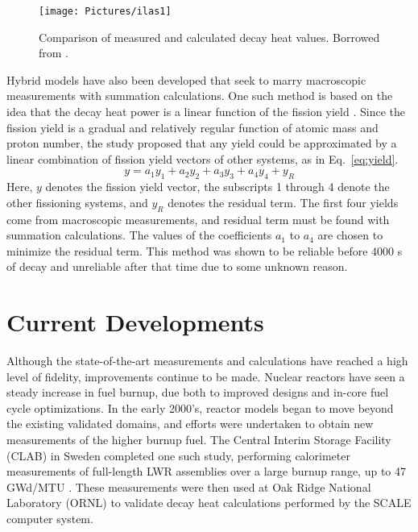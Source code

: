 \documentclass{anstrans}
\begin{document}
\begin{figure}[ht]
 \centering
 \texttt{[image: Pictures/ilas1]}
 \caption{Comparison of measured and calculated decay heat values. Borrowed from \cite{Ilas2006}.}
 \label{fig:ilas1}
\end{figure}

Hybrid models have also been developed that seek to marry macroscopic measurements with summation calculations. One such method is based on the idea that the decay heat power is a linear function of the fission yield \cite{Oyam2001}. Since the fission yield is a gradual and relatively regular function of atomic mass and proton number, the study proposed that any yield could be approximated by a linear combination of fission yield vectors of other systems, as in Eq.~\eqref{eq:yield}.
\begin{equation} \label{eq:yield}
y = a_1 y_1 + a_2 y_2 + a_3 y_3 + a_4 y_4 + y_R
\end{equation}
Here, $y$ denotes the fission yield vector, the subscripts 1 through 4 denote the other fissioning systems, and $y_R$ denotes the residual term. The first four yields come from macroscopic measurements, and residual term must be found with summation calculations. The values of the coefficients $a_1$ to $a_4$ are chosen to minimize the residual term. This method was shown to be reliable before 4000 s of decay and unreliable after that time due to some unknown reason.

\section{Current Developments}
Although the state-of-the-art measurements and calculations have reached a high level of fidelity, improvements continue to be made. Nuclear reactors have seen a steady increase in fuel burnup, due both to improved designs and in-core fuel cycle optimizations. In the early 2000's, reactor models began to move beyond the existing validated domains, and efforts were undertaken to obtain new measurements of the higher burnup fuel. The Central Interim Storage Facility (CLAB) in Sweden completed one such study, performing calorimeter measurements of full-length LWR assemblies over a large burnup range, up to 47 GWd/MTU \cite{Ilas2006}. These measurements were then used at Oak Ridge National Laboratory (ORNL) to validate decay heat calculations performed by the SCALE computer system.
\end{document}
